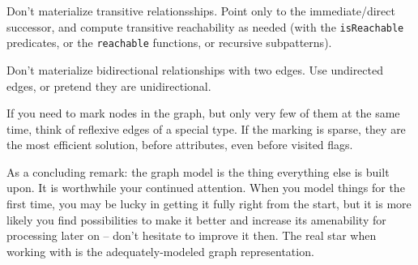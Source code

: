 \pagebreak

\begin{note}
Don't materialize transitive relationsships. 
Point only to the immediate/direct successor, and compute transitive reachability as needed (with the \texttt{isReachable} predicates, or the \texttt{reachable} functions, or recursive subpatterns).
\end{note}

\begin{note}
Don't materialize bidirectional relationships with two edges. 
Use undirected edges, or pretend they are unidirectional.
\end{note}

\begin{note}
If you need to mark nodes in the graph, but only very few of them at the same time, think of reflexive edges of a special type. If the marking is sparse, they are the most efficient solution, before attributes, even before visited flags.
\end{note}

As a concluding remark: the graph model is the thing everything else is built upon.
It is worthwhile your continued attention.
When you model things for the first time, you may be lucky in getting it fully right from the start, but it is more likely you find possibilities to make it better and increase its amenability for processing later on -- don't hesitate to improve it then.
The real star when working with \GrG{} is the adequately-modeled graph representation.

